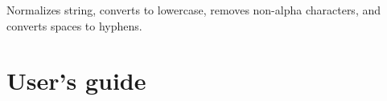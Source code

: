\documentclass[letterpaper,10pt,english]{sphinxmanual}
\begin{document}
\begin{fulllineitems}

\begin{fulllineitems}
\label{index:spy.TextSite.save_new_content}
\end{fulllineitems}


\begin{fulllineitems}
\label{index:spy.TextSite.set_diff}
\end{fulllineitems}


\begin{fulllineitems}
\label{index:spy.TextSite.set_new_content}
\end{fulllineitems}


\begin{fulllineitems}
\label{index:spy.TextSite.set_old_content}
\end{fulllineitems}


\end{fulllineitems}


\begin{fulllineitems}
\label{index:spy.main}
\end{fulllineitems}


\begin{fulllineitems}
\label{index:spy.slugify}
Normalizes string, converts to lowercase, removes non-alpha characters,
and converts spaces to hyphens.

\end{fulllineitems}



\chapter{User's guide}
\label{index:user-s-guide}
\end{document}
